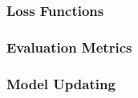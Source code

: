 \subsubsection{Loss Functions}




\subsubsection{Evaluation Metrics}



\subsubsection{Model Updating}

